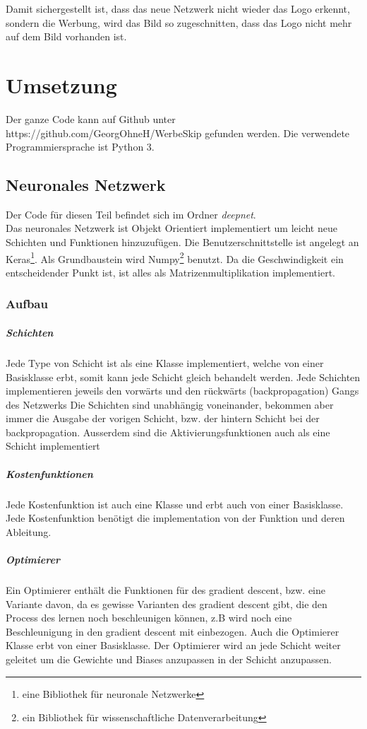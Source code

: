 \documentclass[12pt,a4paper]{report}
\begin{document}
Damit sichergestellt ist, dass das neue Netzwerk nicht wieder das Logo erkennt, sondern die Werbung,
wird das Bild so zugeschnitten, dass das Logo nicht mehr auf dem Bild vorhanden ist.


\chapter{Umsetzung}
\label{ch:umsetzung}
Der ganze Code kann auf Github unter https://github.com/GeorgOhneH/WerbeSkip gefunden werden.
Die verwendete Programmiersprache ist Python 3.
\section{Neuronales Netzwerk}
Der Code für diesen Teil befindet sich im Ordner \textit{deepnet}.\bigskip\\
Das neuronales Netzwerk ist Objekt Orientiert implementiert um leicht neue Schichten und Funktionen hinzuzufügen.
Die Benutzerschnittstelle ist angelegt an Keras\footnote{eine Bibliothek für neuronale Netzwerke}.
Als Grundbaustein wird Numpy\footnote{ein Bibliothek für wissenschaftliche Datenverarbeitung} benutzt.
Da die Geschwindigkeit ein entscheidender Punkt ist, ist alles als Matrizenmultiplikation implementiert.

\subsection{Aufbau}
\paragraph{Schichten}
Jede Type von Schicht ist als eine Klasse implementiert, welche von einer Basisklasse erbt, somit kann jede Schicht gleich behandelt werden.
Jede Schichten implementieren jeweils den vorwärts und den rückwärts (backpropagation) Gangs des Netzwerks
Die Schichten sind unabhängig voneinander, bekommen aber immer die Ausgabe der vorigen Schicht, bzw. der hintern Schicht bei der backpropagation.
Ausserdem sind die Aktivierungsfunktionen auch als eine Schicht implementiert
\paragraph{Kostenfunktionen}
Jede Kostenfunktion ist auch eine Klasse und erbt auch von einer Basisklasse.
Jede Kostenfunktion benötigt die implementation von der Funktion und deren Ableitung.
\paragraph{Optimierer}
Ein Optimierer enthält die Funktionen für des gradient descent, bzw. eine Variante davon,
da es gewisse Varianten des gradient descent gibt, die den Process des lernen noch beschleunigen können,
z.B wird noch eine Beschleunigung in den gradient descent mit einbezogen.\cite{optimization}
Auch die Optimierer Klasse erbt von einer Basisklasse.
Der Optimierer wird an jede Schicht weiter geleitet um die Gewichte und Biases anzupassen in der Schicht anzupassen.
\end{document}
